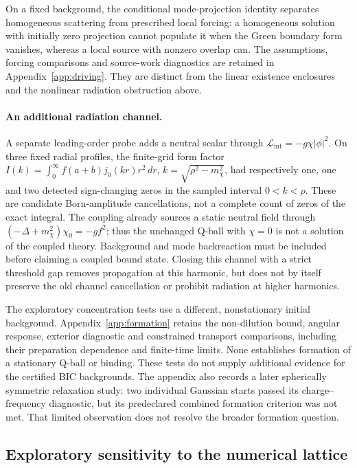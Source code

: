 \documentclass[a4paper,11pt]{article}
\begin{document}
On a fixed background, the conditional mode-projection identity separates
homogeneous scattering from prescribed local forcing: a homogeneous
solution with initially zero projection cannot populate it when the Green
boundary form vanishes, whereas a local source with nonzero overlap can.
The assumptions, forcing comparisons and source-work diagnostics are
retained in Appendix~\ref{app:driving}. They are distinct from the linear
existence enclosures and the nonlinear radiation obstruction above.

\paragraph{An additional radiation channel.}
A separate leading-order probe adds a neutral scalar through
$\mathcal L_{\mathrm{int}}=-g\chi|\phi|^2$. On three fixed radial profiles,
the finite-grid form factor
$I(k)=\int_0^\infty f(a+b)j_0(kr)r^2\,dr$,
$k=\sqrt{\rho^2-m_\chi^2}$, had respectively one, one and two detected
sign-changing zeros in the sampled interval $0<k<\rho$.
These are candidate Born-amplitude cancellations, not a complete count
of zeros of the exact integral. The coupling already sources a static
neutral field through $(-\Delta+m_\chi^2)\chi_0=-gf^2$; thus the
unchanged Q-ball with $\chi=0$ is not a solution of the coupled theory.
Background and mode backreaction must be included before claiming a
coupled bound state. Closing this channel with a strict threshold gap
removes propagation at this harmonic, but does not by itself preserve
the old channel cancellation or prohibit radiation at higher harmonics.

The exploratory concentration tests use a different, nonstationary initial
background. Appendix~\ref{app:formation} retains the non-dilution bound,
angular response, exterior diagnostic and constrained transport comparisons,
including their preparation dependence and finite-time limits. None
establishes formation of a stationary Q-ball or binding. These tests do
not supply additional evidence for the certified BIC backgrounds.
The appendix also records a later spherically symmetric relaxation study:
two individual Gaussian starts passed its charge--frequency diagnostic,
but its predeclared combined formation criterion was not met. That
limited observation does not resolve the broader formation question.

\subsection{Exploratory sensitivity to the numerical lattice}
\end{document}
